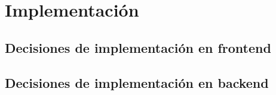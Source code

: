 \chapter{Implementación}

\section{Decisiones de implementación en frontend}


\section{Decisiones de implementación en backend}




